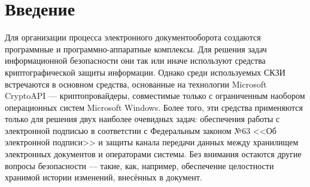 \section{Введение} \label{subsect1_1}



\vspace{\baselineskip}
Для организации процесса электронного документооборота создаются программные и программно-аппаратные комплексы. Для решения задач информационной безопасности они так или иначе используют средства криптографической защиты информации. Однако среди используемых СКЗИ встречаются в основном средства, основанные на технологии Microsoft CryptoAPI --- криптопровайдеры, совместимые только с ограниченным наобором операционных систем Microsoft Windows. Более того, эти средства применяются только для решения двух наиболее очевидных задач: обеспечения работы с электронной подписью в соответстии с Федеральным законом №63 <<Об электронной подписи>> и защиты канала передачи данных между хранилищем электронных документов и операторами системы. Без внимания остаются другие вопросы безопасности --- такие, как, например, обеспечение целостности хранимой истории изменений, внесённых в документ.


